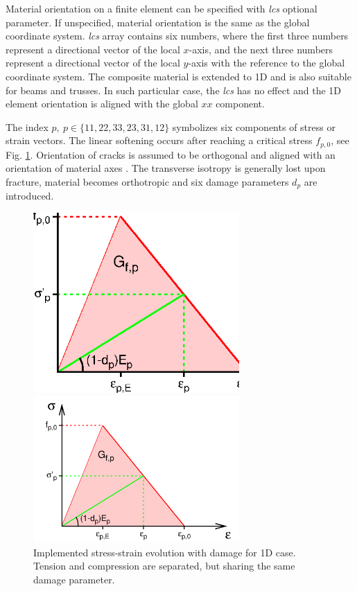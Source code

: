 \documentclass[a4paper]{article}
\newcommand{\param}[1]{{\it #1}}
\begin{document}
Material orientation on a finite element can be specified with \param{lcs} optional parameter. If unspecified, material orientation is the same as the global coordinate system. \param{lcs} array contains six numbers,
where the first three numbers represent a directional vector of the local $x$-axis, and the next three numbers represent a directional vector of the local $y$-axis with the reference to the global coordinate system. The composite material is extended to 1D and is also suitable for beams and trusses. In such particular case, the \param{lcs} has no effect and the 1D element orientation is aligned with the global $xx$ component.

The index $p,~p\in\{11,22,33,23,31,12\}$ symbolizes six components of stress or strain vectors. The linear softening occurs after reaching a critical stress $f_{p,0}$, see Fig. \ref{comp_softening}. Orientation of cracks is assumed to be orthogonal and aligned with an orientation of material axes \cite[pp.236]{Bazant:98}. The transverse isotropy is generally lost upon fracture, material becomes orthotropic and six damage parameters $d_p$ are introduced.

\begin{figure}[!htb]
\begin{htmlonly}
  \centerline{\includegraphics[width=0.7\textwidth]{Compodamagemat_diag.eps}}
\end{htmlonly}
 \centerline{\includegraphics[width=0.7\textwidth]{Compodamagemat_diag}}
  \caption{Implemented stress-strain evolution with damage for 1D case. Tension and compression are separated, but sharing the same damage parameter.}
  \label{comp_softening}
\end{figure}
\end{document}
